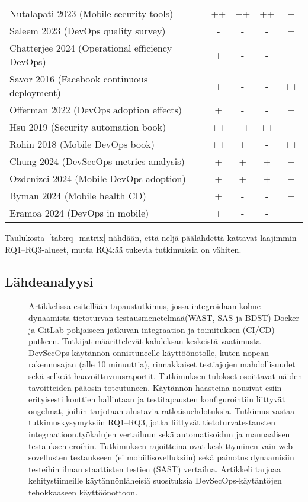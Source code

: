 \documentclass[bscthesis,finnish,oneside,biblatex]{uefcsthesis}
\begin{document}
\begin{table}[htbp]
\begin{tabular}{p{7cm}cccc}
    Nutalapati 2023 (Mobile security tools)             &  ++  &  ++ &  ++ &  +  \\
    Saleem 2023 (DevOps quality survey)                 &  -   &  -  &  -  &  +  \\
    Chatterjee 2024 (Operational efficiency DevOps)     &  +   &  -  &  -  &  +  \\
    Savor 2016 (Facebook continuous deployment)         &  +   &  -  &  -  &  ++ \\
    Offerman 2022 (DevOps adoption effects)             &  +   &  -  &  -  &  +  \\
    Hsu 2019 (Security automation book)                 &  ++  &  ++ &  ++ &  +  \\
    Rohin 2018 (Mobile DevOps book)                     &  ++  &  +  &  -  &  ++ \\
    Chung 2024 (DevSecOps metrics analysis)             &  +   &  +  &  +  &  +  \\
    Ozdenizci 2024 (Mobile DevOps adoption)             &  +   &  +  &  +  &  +  \\
    Byman 2024 (Mobile health CD)                       &  +   &  -  &  -  &  +  \\
    Eramoa 2024 (DevOps in mobile)                      &  +   &  -  &  -  &  +  \\
    \bottomrule
  \end{tabular}
\end{table}


Taulukosta~\ref{tab:rq_matrix} nähdään, että neljä päälähdettä
kattavat laajimmin RQ1–RQ3-alueet, mutta RQ4:ää tukevia tutkimuksia on
vähiten.

\subsection{Lähdeanalyysi}
\begin{description}
    \item[\cite{rangnau2020_cst}] Artikkelissa esitellään tapaustutkimus, jossa integroidaan kolme dynaamista tietoturvan testausmenetelmää(WAST, SAS ja BDST) Docker- ja GitLab-pohjaiseen jatkuvan integraation ja toimituksen (CI/CD) putkeen. Tutkijat määrittelevät kahdeksan keskeistä vaatimusta DevSecOps-käytännön onnistuneelle käyttöönotolle, kuten nopean rakennusajan (alle 10 minuuttia), rinnakkaiset testiajojen mahdollisuudet sekä selkeät haavoittuvuusraportit. Tutkimuksen tulokset osoittavat näiden tavoitteiden pääosin toteutuneen. Käytännön haasteina nousivat esiin erityisesti konttien hallintaan ja testitapausten konfigurointiin liittyvät ongelmat, joihin tarjotaan alustavia ratkaisuehdotuksia. Tutkimus vastaa tutkimuskysymyksiin RQ1–RQ3, jotka liittyvät tietoturvatestausten integraatioon,työkalujen vertailuun sekä automatisoidun ja manuaalisen testauksen eroihin. Tutkimuksen rajoitteina ovat keskittyminen vain web-sovellusten testaukseen (ei mobiilisovelluksiin) sekä painotus dynaamisiin testeihin ilman staattisten testien (SAST) vertailua. Artikkeli tarjoaa kehitystiimeille käytännönläheisiä suosituksia DevSecOps-käytäntöjen tehokkaaseen käyttöönottoon.
\end{description}
\end{document}
